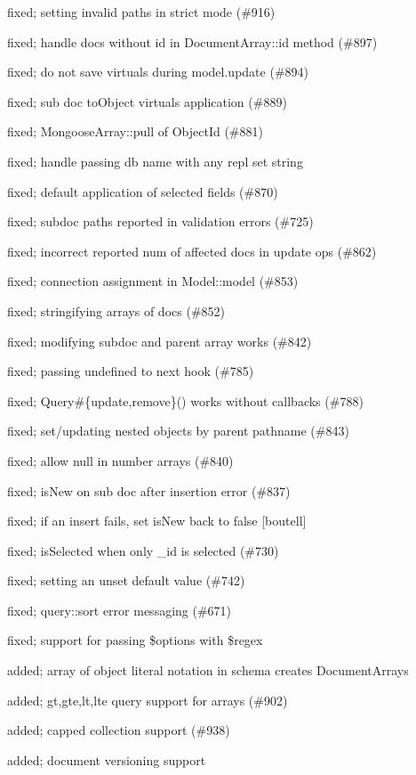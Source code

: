 \begin{DoxyItemize}
\item fixed; setting invalid paths in strict mode (\#916)
\item fixed; handle docs without id in Document\+Array\+::id method (\#897)
\item fixed; do not save virtuals during model.\+update (\#894)
\item fixed; sub doc to\+Object virtuals application (\#889)
\item fixed; Mongoose\+Array\+::pull of Object\+Id (\#881)
\item fixed; handle passing db name with any repl set string
\item fixed; default application of selected fields (\#870)
\item fixed; subdoc paths reported in validation errors (\#725)
\item fixed; incorrect reported num of affected docs in update ops (\#862)
\item fixed; connection assignment in Model\+::model (\#853)
\item fixed; stringifying arrays of docs (\#852)
\item fixed; modifying subdoc and parent array works (\#842)
\item fixed; passing undefined to next hook (\#785)
\item fixed; Query\#\{update,remove\}() works without callbacks (\#788)
\item fixed; set/updating nested objects by parent pathname (\#843)
\item fixed; allow null in number arrays (\#840)
\item fixed; is\+New on sub doc after insertion error (\#837)
\item fixed; if an insert fails, set is\+New back to false \mbox{[}boutell\mbox{]}
\item fixed; is\+Selected when only \+\_\+id is selected (\#730)
\item fixed; setting an unset default value (\#742)
\item fixed; query\+::sort error messaging (\#671)
\item fixed; support for passing \$options with \$regex
\item added; array of object literal notation in schema creates Document\+Arrays
\item added; gt,gte,lt,lte query support for arrays (\#902)
\item added; capped collection support (\#938)
\item added; document versioning support

\end{DoxyItemize}

